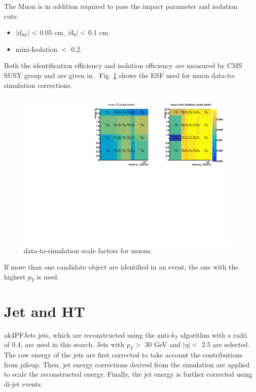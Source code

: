 \documentclass[thesis.tex]{subfiles}
\renewcommand\_{\textunderscore\allowbreak}
\begin{document}
The Muon is in addition required to pass the impact parameter and isolation cuts:
\begin{center}
\begin{itemize}
\item $\mathrm{|d_{xy}|} <$ 0.05 cm, $\mathrm{|d_{z}|} <$ 0.1 cm.
\item mini-Isolation $<$ 0.2.
\end{itemize}
\end{center}

Both the identification efficiency and isolation efficiency are measured by CMS SUSY group and are given in \cite{EGM:leptonScale}. Fig. \ref{fig:muonsf} shows the ESF used for muon data-to-simulation corrections.

\begin{figure}[hbtp]
	\centering
	\includegraphics[width=0.99\textwidth]{plot/SF_Muon.pdf}
	\caption{data-to-simulation scale factors for muons.}
	\label{fig:muonsf}
\end{figure}

If more than one candidate object are identified in an event, the one with the highest $p_{T}$ is used.

\section{Jet and HT}
\label{sec:jetID}
ak4PFJets jets, which are reconstructed using the anti-$k_T$ algorithm with a radii of 0.4, are used in this search.
Jets with $p_T >$ 30 GeV and $|\eta| <$ 2.5 are selected. 
The raw energy of the jets are first corrected to take account the contributions from pileup.
Then, jet energy corrections \cite{CMS:JES} derived from the simulation are applied to scale the reconstructed energy.
Finally, the jet energy is further corrected using di-jet events. 
\end{document}
